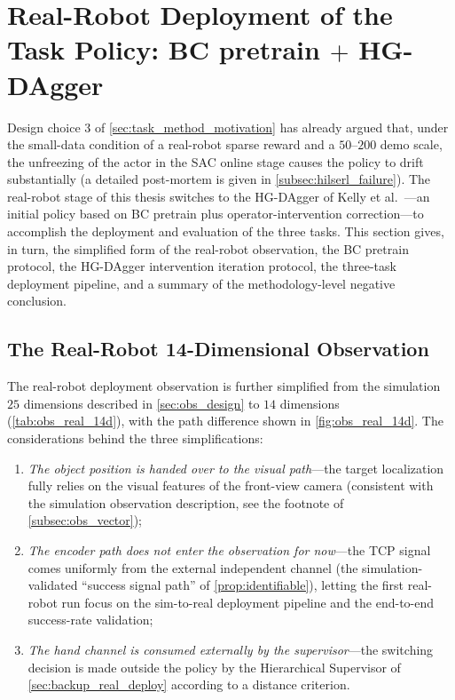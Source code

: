 \section{Real-Robot Deployment of the Task Policy: BC pretrain $+$ HG-DAgger}\label{sec:real_task_deploy}

Design choice 3 of \cref{sec:task_method_motivation} has already argued that, under the small-data condition of a real-robot sparse reward and a $50$--$200$ demo scale, the unfreezing of the actor in the SAC online stage causes the policy to drift substantially (a detailed post-mortem is given in \cref{subsec:hilserl_failure}). The real-robot stage of this thesis switches to the HG-DAgger of Kelly et al.~\cite{kelly2019hgdagger}---an initial policy based on BC pretrain plus operator-intervention correction---to accomplish the deployment and evaluation of the three tasks. This section gives, in turn, the simplified form of the real-robot observation, the BC pretrain protocol, the HG-DAgger intervention iteration protocol, the three-task deployment pipeline, and a summary of the methodology-level negative conclusion.

\subsection{The Real-Robot 14-Dimensional Observation}\label{subsec:real_obs}

The real-robot deployment observation is further simplified from the simulation $25$ dimensions described in \cref{sec:obs_design} to $14$ dimensions (\cref{tab:obs_real_14d}), with the path difference shown in \cref{fig:obs_real_14d}. The considerations behind the three simplifications:

\begin{enumerate}
  \item \emph{The object position is handed over to the visual path}---the target localization fully relies on the visual features of the front-view camera (consistent with the simulation observation description, see the footnote of \cref{subsec:obs_vector});
  \item \emph{The encoder path does not enter the observation for now}---the TCP signal comes uniformly from the external independent channel (the simulation-validated ``success signal path'' of \cref{prop:identifiable}), letting the first real-robot run focus on the sim-to-real deployment pipeline and the end-to-end success-rate validation;
  \item \emph{The hand channel is consumed externally by the supervisor}---the switching decision is made outside the policy by the Hierarchical Supervisor of \cref{sec:backup_real_deploy} according to a distance criterion.
\end{enumerate}

